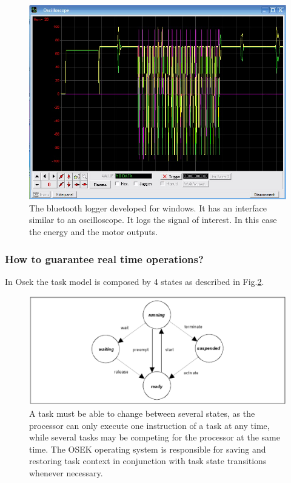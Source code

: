 \begin{figure}[htbp]
\begin{center}
\includegraphics[scale=0.8]{figures/legonxt/oscilloscope.eps}
\caption[Bluetooth log diagram]{The bluetooth logger developed for windows. It has an interface similar
to an oscilloscope. It logs the signal of interest.
In this case the energy and the motor outputs.
 \label{nxtOsek:oscilloscope}}
\end{center}
\end{figure}

\subsubsection{How to guarantee real time operations?}
In Osek the task model is composed by 4 states as described in Fig.\ref{nxtOsek:taskModel}.
\begin{figure}[htbp]
\begin{center}
\includegraphics[scale=0.4]{figures/nxtosek/taskmodel.eps}
\caption[Real time task allocation]{A task must be able to change between several states, as the processor can only execute one
instruction of a task at any time, while several tasks may be competing for the processor at the
same time. The OSEK operating system is responsible for saving and restoring task context in
conjunction with task state transitions whenever necessary.
 \label{nxtOsek:taskModel}}
\end{center}
\end{figure}

